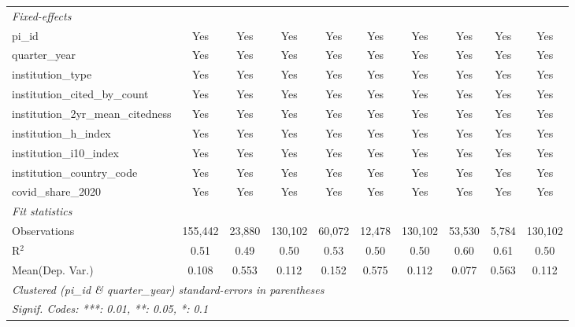 \begin{tabular}{lccccccccc}
   \midrule
   \emph{Fixed-effects}\\
   pi\_id                                                      & Yes            & Yes            & Yes           & Yes           & Yes            & Yes           & Yes           & Yes           & Yes\\  
   quarter\_year                                               & Yes            & Yes            & Yes           & Yes           & Yes            & Yes           & Yes           & Yes           & Yes\\  
   institution\_type                                           & Yes            & Yes            & Yes           & Yes           & Yes            & Yes           & Yes           & Yes           & Yes\\  
   institution\_cited\_by\_count                               & Yes            & Yes            & Yes           & Yes           & Yes            & Yes           & Yes           & Yes           & Yes\\  
   institution\_2yr\_mean\_citedness                           & Yes            & Yes            & Yes           & Yes           & Yes            & Yes           & Yes           & Yes           & Yes\\  
   institution\_h\_index                                       & Yes            & Yes            & Yes           & Yes           & Yes            & Yes           & Yes           & Yes           & Yes\\  
   institution\_i10\_index                                     & Yes            & Yes            & Yes           & Yes           & Yes            & Yes           & Yes           & Yes           & Yes\\  
   institution\_country\_code                                  & Yes            & Yes            & Yes           & Yes           & Yes            & Yes           & Yes           & Yes           & Yes\\  
   covid\_share\_2020                                          & Yes            & Yes            & Yes           & Yes           & Yes            & Yes           & Yes           & Yes           & Yes\\  
   \midrule
   \emph{Fit statistics}\\
   Observations                                                & 155,442        & 23,880         & 130,102       & 60,072        & 12,478         & 130,102       & 53,530        & 5,784         & 130,102\\  
   R$^2$                                                       & 0.51           & 0.49           & 0.50          & 0.53          & 0.50           & 0.50          & 0.60          & 0.61          & 0.50\\  
Mean(Dep. Var.) & 0.108 & 0.553 & 0.112 & 0.152 & 0.575 & 0.112 & 0.077 & 0.563 & 0.112 \\
   \midrule \midrule
   \multicolumn{10}{l}{\emph{Clustered (pi\_id \& quarter\_year) standard-errors in parentheses}}\\
   \multicolumn{10}{l}{\emph{Signif. Codes: ***: 0.01, **: 0.05, *: 0.1}}\\
\end{tabular}
\par\endgroup
